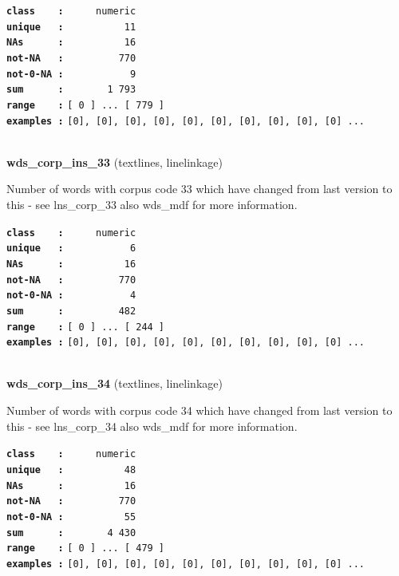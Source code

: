 \documentclass[]{article}
\begin{document}
\textbf{\texttt{class\ \ \ \ :}} \texttt{~~~~~numeric}\\
\textbf{\texttt{unique\ \ \ :}} \texttt{~~~~~~~~~~11}\\
\textbf{\texttt{NAs\ \ \ \ \ \ :}} \texttt{~~~~~~~~~~16}\\
\textbf{\texttt{not-NA\ \ \ :}} \texttt{~~~~~~~~~770}\\
\textbf{\texttt{not-0-NA\ :}} \texttt{~~~~~~~~~~~9}\\
\textbf{\texttt{sum\ \ \ \ \ \ :}} \texttt{~~~~~~~1~793}\\
\textbf{\texttt{range\ \ \ \ :}}
\texttt{{[}\ 0\ {]}\ ...\ {[}\ 779\ {]}}\\
\textbf{\texttt{examples\ :}}
\texttt{{[}0{]},\ {[}0{]},\ {[}0{]},\ {[}0{]},\ {[}0{]},\ {[}0{]},\ {[}0{]},\ {[}0{]},\ {[}0{]},\ {[}0{]}\ ...}\\

~

\textbf{wds\_corp\_ins\_33} (textlines, linelinkage)

Number of words with corpus code 33 which have changed from last version
to this - see lns\_corp\_33 also wds\_mdf for more information.

\textbf{\texttt{class\ \ \ \ :}} \texttt{~~~~~numeric}\\
\textbf{\texttt{unique\ \ \ :}} \texttt{~~~~~~~~~~~6}\\
\textbf{\texttt{NAs\ \ \ \ \ \ :}} \texttt{~~~~~~~~~~16}\\
\textbf{\texttt{not-NA\ \ \ :}} \texttt{~~~~~~~~~770}\\
\textbf{\texttt{not-0-NA\ :}} \texttt{~~~~~~~~~~~4}\\
\textbf{\texttt{sum\ \ \ \ \ \ :}} \texttt{~~~~~~~~~482}\\
\textbf{\texttt{range\ \ \ \ :}}
\texttt{{[}\ 0\ {]}\ ...\ {[}\ 244\ {]}}\\
\textbf{\texttt{examples\ :}}
\texttt{{[}0{]},\ {[}0{]},\ {[}0{]},\ {[}0{]},\ {[}0{]},\ {[}0{]},\ {[}0{]},\ {[}0{]},\ {[}0{]},\ {[}0{]}\ ...}\\

~

\textbf{wds\_corp\_ins\_34} (textlines, linelinkage)

Number of words with corpus code 34 which have changed from last version
to this - see lns\_corp\_34 also wds\_mdf for more information.

\textbf{\texttt{class\ \ \ \ :}} \texttt{~~~~~numeric}\\
\textbf{\texttt{unique\ \ \ :}} \texttt{~~~~~~~~~~48}\\
\textbf{\texttt{NAs\ \ \ \ \ \ :}} \texttt{~~~~~~~~~~16}\\
\textbf{\texttt{not-NA\ \ \ :}} \texttt{~~~~~~~~~770}\\
\textbf{\texttt{not-0-NA\ :}} \texttt{~~~~~~~~~~55}\\
\textbf{\texttt{sum\ \ \ \ \ \ :}} \texttt{~~~~~~~4~430}\\
\textbf{\texttt{range\ \ \ \ :}}
\texttt{{[}\ 0\ {]}\ ...\ {[}\ 479\ {]}}\\
\textbf{\texttt{examples\ :}}
\texttt{{[}0{]},\ {[}0{]},\ {[}0{]},\ {[}0{]},\ {[}0{]},\ {[}0{]},\ {[}0{]},\ {[}0{]},\ {[}0{]},\ {[}0{]}\ ...}\\
\end{document}
